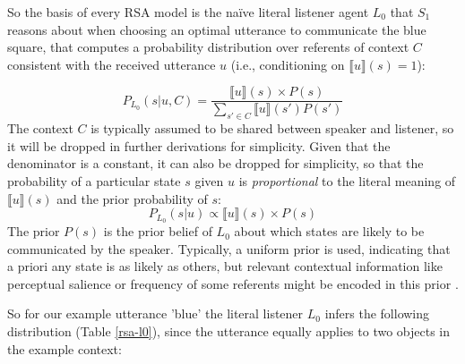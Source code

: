 So the basis of every RSA model is the na\"ive literal listener agent $L_0$ that $S_1$ reasons about when choosing an optimal utterance to communicate the blue square, that computes a probability distribution over referents of context $C$  consistent with the received utterance $u$ (i.e., conditioning on $\llbracket u \rrbracket (s) = 1$): %

$$P_{L_0}(s | u, C) = \frac{\llbracket u \rrbracket (s) \times P(s)}{\sum_{s' \in C} \llbracket u \rrbracket (s') P(s')}$$
The context $C$ is typically assumed to be shared between speaker and listener, so it will be dropped in further derivations for simplicity. Given that the denominator is a constant, it can also be dropped for simplicity, so that the probability of a particular state $s$ given $u$ is \emph{proportional} to the literal meaning of $\llbracket u \rrbracket (s)$ and the prior probability of $s$: 
$$P_{L_0}(s | u) \propto \llbracket u \rrbracket (s) \times P(s)$$
The prior $P(s)$ is the prior belief of $L_0$ about which states are likely to be communicated by the speaker. Typically, a uniform prior is used, indicating that a priori any state is as likely as others, but relevant contextual information like perceptual salience or frequency of some referents might be encoded in this prior \parencite{frank2012predicting}.
  
So for our example utterance 'blue' the literal listener $L_0$ infers the following distribution (Table \ref{rsa-l0}), since the utterance equally applies to two objects in the example context:

